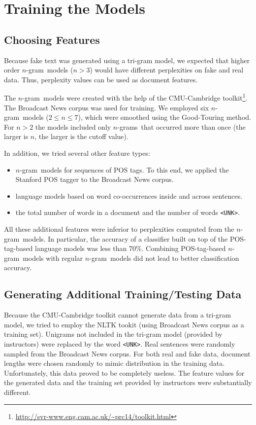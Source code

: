 \documentclass[11pt]{article}
\newcommand{\ngram}{\mbox{$n$-gram }}
\newcommand{\ngrams}{\mbox{$n$-grams }}
\newcommand{\leocomment}[1]{\todo[color=red!40,caption={Leo's comment}]{#1}}
\begin{document}
\section{Training the Models} 
\subsection{Choosing Features} Because fake text was generated using a tri-gram model, we expected that
higher order \ngram models ($n>3$) would have different perplexities on fake and real data. 
Thus, perplexity values can be used as document features. 

The \ngram models were created with the help of the CMU-Cambridge toolkit\footnote{\url{http://svr-www.eng.cam.ac.uk/~prc14/toolkit.html}}.  The Broadcast News corpus was used for training. 
We employed six \ngram models ($2 \le n \le 7$), which were smoothed using the Good-Touring method.
For $n>2$ the models included only \ngrams that occurred more than once (the larger is $n$, the larger is the cutoff value).

In addition, we tried several other feature types:
\begin{itemize}
\item \ngram models for sequences of POS tags. To this end, we applied the Stanford POS tagger 
to the Broadcast News corpus. 
\item language models based on word co-occurrences inside and across sentences.  \leocomment{Di, please, expand here.}
\item the total number of words in a document and the number of words \texttt{<UNK>}.
\end{itemize}
All these additional features were inferior to perplexities computed from the \ngram models.
In particular, the accuracy of a classifier built on top of the POS-tag-based language models
was less than 70\%. Combining POS-tag-based \ngram models with regular \ngram models did not lead
to better classification accuracy.

\subsection{Generating Additional Training/Testing Data}\label{SectGen}
Because the CMU-Cambridge toolkit cannot generate data from a tri-gram model,
we tried to employ the NLTK tookit (using Broadcast News corpus as a training set). 
Unigrams not included in the tri-gram model (provided by instructors) were replaced by the word \texttt{<UNK>}.
Real sentences were randomly sampled from the Broadcast News corpus.
For both real and fake data, document lengths were chosen randomly to mimic distribution in the training data.
Unfortunately, this data proved to be completely useless. The feature values for the generated data
and the training set provided by instructors were substantially different.
\end{document}
